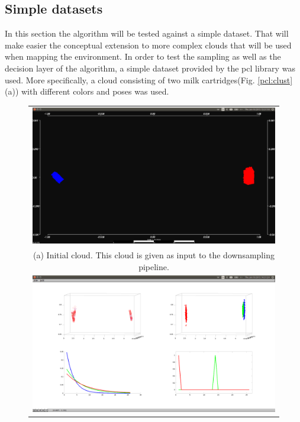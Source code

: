 \documentclass[twoside,hidelinks]{article}
\begin{document}
\subsection{Simple datasets}

In this section the algorithm will be tested against a simple dataset. That will make easier the conceptual extension to more complex clouds that will be used when mapping the environment. In order to test the sampling as well as the decision layer of the algorithm, a simple dataset provided by the pcl\cite{pcl} library was used. More specifically, a cloud consisting of two milk cartridges(Fig. \ref{pcl:clust}(a)) with different colors and poses was used. 

\begin{figure}
\begin{tabular}{c}
  \includegraphics[width=1\textwidth]{clusterings/initialData} \\
  (a) Initial cloud. This cloud is given as input to the downsampling pipeline.  \\
   \includegraphics[width=1\textwidth]{clusterings/colorcodedDistributions} \\

\end{tabular}
\end{figure}
\end{document}
